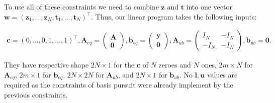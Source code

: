 \documentclass[12pt,a4paper]{amsart}
\numberwithin{equation}{section}
\theoremstyle{plain}
\theoremstyle{definition}
\newcommand{\bdy}{\mathbf{y}}
\newcommand{\bdz}{\mathbf{z}}
\newcommand{\bdb}{\mathbf{b}}
\newcommand{\bdu}{\mathbf{u}}
\newcommand{\bdw}{\mathbf{w}}
\newcommand{\bdc}{\mathbf{c}}
\newcommand{\bdl}{\mathbf{l}}
\newcommand{\bdt}{\mathbf{t}}
\newcommand{\bdA}{\mathbf{A}}
\begin{document}
\begin{appendices}
To use all of these constraints we need to combine $\bdz$ and $\bdt$ into one vector $\bdw=(\bdz_1,...,\bdz_N,\bdt_1,...,\bdt_N)^\top$. Thus, our linear program takes the following inputs:

\begin{align*}
    \bdc=(0,...,0,1,...,1)^\top,\bdA_{eq}=\begin{pmatrix}\bdA \\ \mathbf{0}\end{pmatrix},\bdb_{eq}=\begin{pmatrix}\bdy \\ \mathbf{0}\end{pmatrix},\bdA_{ub}=\begin{pmatrix}I_N & -I_N \\ -I_N & -I_N\end{pmatrix},\bdb_{ub}=\mathbf{0}.
\end{align*}

They have respective shape $2N\times 1$ for the $\bdc$ of $N$ zeroes and $N$ ones, $2m\times N$ for $\bdA_{eq}$, $2m\times 1$ for $\bdb_{eq}$, $2N\times 2N$ for $\bdA_{ub}$, and $2N\times 1$ for $\bdb_{ub}$.  No $\bdl,\bdu$ values are required as the constraints of basis pursuit were already implement by the previous constraints.

\end{appendices}
\end{document}
